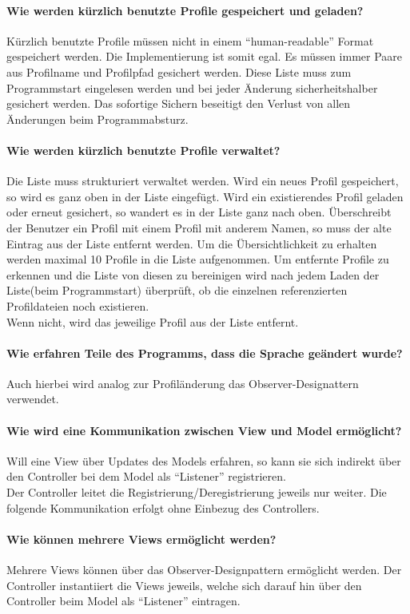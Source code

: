   \paragraph{Wie werden kürzlich benutzte Profile gespeichert und geladen?}
  Kürzlich benutzte Profile müssen nicht in einem "`human-readable"' Format gespeichert werden. Die Implementierung ist somit egal.
  Es müssen immer Paare aus Profilname und Profilpfad gesichert werden. Diese Liste muss zum Programmstart eingelesen werden und bei jeder Änderung sicherheitshalber gesichert werden.
  Das sofortige Sichern beseitigt den Verlust von allen Änderungen beim Programmabsturz.
  \paragraph{Wie werden kürzlich benutzte Profile verwaltet?}
  Die Liste muss strukturiert verwaltet werden. Wird ein neues Profil gespeichert, so wird es ganz oben in der Liste eingefügt.
  Wird ein existierendes Profil geladen oder erneut gesichert, so wandert es in der Liste ganz nach oben. Überschreibt der Benutzer ein Profil mit
  einem Profil mit anderem Namen, so muss der alte Eintrag aus der Liste entfernt werden. Um die Übersichtlichkeit zu erhalten werden maximal 10 Profile in die Liste aufgenommen.
  Um entfernte Profile zu erkennen und die Liste von diesen zu bereinigen wird nach jedem Laden der Liste(beim Programmstart) überprüft, ob die einzelnen referenzierten Profildateien noch existieren.\\
  Wenn nicht, wird das jeweilige Profil aus der Liste entfernt.
  \paragraph{Wie erfahren Teile des Programms, dass die Sprache geändert wurde?}
  Auch hierbei wird analog zur Profiländerung das Observer-Designattern verwendet.
  \paragraph{Wie wird eine Kommunikation zwischen View und Model ermöglicht?}
  Will eine View über Updates des Models erfahren, so kann sie sich indirekt über den Controller bei dem Model als "`Listener"' registrieren.\\
  Der Controller leitet die Registrierung/Deregistrierung jeweils nur weiter. Die folgende Kommunikation erfolgt ohne Einbezug des Controllers.
  \paragraph{Wie können mehrere Views ermöglicht werden?}
  Mehrere Views können über das Observer-Designpattern ermöglicht werden. Der Controller instantiiert die Views jeweils, welche sich darauf hin über den Controller beim Model als "`Listener"' eintragen.
